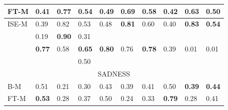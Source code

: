 \documentclass[11pt]{article}
\begin{document}
\begin{table}[ht]
\begin{tabular}{|l||l|l|l||l|l|l||l|l|l|}
\hline
    \tiny{FT-M} & 
    \footnotesize{0.41} & 
    \footnotesize{0.77} & 
    \footnotesize{0.54} & 
    \footnotesize{0.49} & 
    \footnotesize{0.69} & 
    \footnotesize{0.58} &
    \footnotesize{\textbf{0.42}} & 
    \footnotesize{0.63} & 
    \footnotesize{0.50} \\ 

\hline
    \tiny{ISE-M} & 
    \footnotesize{0.39} & 
    \footnotesize{0.82} & 
    \footnotesize{0.53} & 
    \footnotesize{0.48} & 
    \footnotesize{\textbf{0.81}} & 
    \footnotesize{0.60} & 
    \footnotesize{{0.40}} & 
    \footnotesize{\textbf{0.83}} & 
    \footnotesize{\textbf{0.54}} \\ 

\hline 
    \tiny{\cite{strapparava2008learning} } &
    \footnotesize{0.19} & 
    \footnotesize{\textbf{0.90}} & 
    \footnotesize{0.31} &
    &
    &
    &
    &
    &
    \\

\hline
    \tiny{\cite{kim2010evaluation}} &
    \footnotesize{\textbf{0.77}} & 
    \footnotesize{0.58} & 
    \footnotesize{\textbf{0.65}} &
    \footnotesize{\textbf{0.80}} & 
    \footnotesize{{0.76}} & 
    \footnotesize{\textbf{0.78}} &
    \footnotesize{0.39} & 
    \footnotesize{0.01} & 
    \footnotesize{0.01} \\
    
\hline
    \tiny{\cite{danisman2008feeler}} &
    \footnotesize{} & 
    \footnotesize{} & 
    \footnotesize{0.50} &
    \footnotesize{} & 
    \footnotesize{} & 
    \footnotesize{} &
    \footnotesize{} & 
    \footnotesize{} & 
    \footnotesize{} \\
    
\hline
\hline
    \multicolumn{10}{|c|}{{SADNESS}} \\ 
    
\hline
    \tiny{B-M} & 
    \footnotesize{0.51} & 
    \footnotesize{0.21} & 
    \footnotesize{0.30} & 
    \footnotesize{0.43} & 
    \footnotesize{0.39} & 
    \footnotesize{0.41} & 
    \footnotesize{0.50} & 
    \footnotesize{\textbf{0.39}} & 
    \footnotesize{\textbf{0.44}} \\ 

\hline
    \tiny{FT-M} & 
    \footnotesize{\textbf{0.53}} & 
    \footnotesize{0.28} & 
    \footnotesize{0.37} & 
    \footnotesize{0.50} & 
    \footnotesize{0.24} & 
    \footnotesize{0.33} & 
    \footnotesize{\textbf{0.79}} & 
    \footnotesize{0.28} & 
    \footnotesize{0.41} \\ 


\end{tabular}
\end{table}
\end{document}
